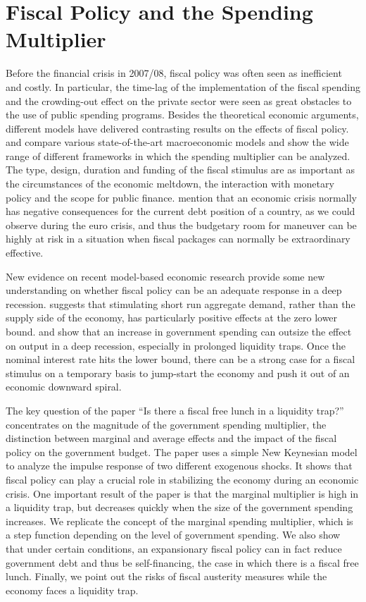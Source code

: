 \section{Fiscal Policy and the Spending Multiplier }

Before the financial crisis in 2007/08, fiscal policy was often seen as inefficient and costly. In particular, the time-lag of the implementation of the fiscal spending and the crowding-out effect on the private sector were seen as great obstacles to the use of public spending programs. Besides the theoretical economic arguments, different models have delivered contrasting results on the effects of fiscal policy. \citet{CoenenG..2010} and \citet{Afonso.2010} compare various state-of-the-art macroeconomic models and show the wide range of different frameworks in which the spending multiplier can be analyzed. The type, design, duration and funding of the fiscal stimulus are as important as the circumstances of the economic meltdown, the interaction with monetary policy and the scope for public finance. \citet{Coenen.2010} mention that an economic crisis normally has negative consequences for the current debt position of a country, as we could observe during the euro crisis, and thus the budgetary room for maneuver can be highly at risk in a situation when fiscal packages can normally be extraordinary effective.
\par
\bigskip
New evidence on recent model-based economic research provide some new understanding on whether fiscal policy can be an adequate response in a deep recession. \citet{Eggertsson.2011} suggests that stimulating short run aggregate demand, rather than the supply side of the economy, has particularly positive effects at the zero lower bound. \citet{Davig.2009} and \citet{Christiano.2011} show that an increase in government spending can outsize the effect on output in a deep recession, especially in prolonged liquidity traps. Once the nominal interest rate hits the lower bound, there can be a strong case for a fiscal stimulus on a temporary basis to jump-start the economy and push it out of an economic downward spiral.
\par
\bigskip
The key question of the paper ``Is there a fiscal free lunch in a liquidity trap?'' concentrates on the magnitude of the government spending multiplier, the distinction between marginal and average effects and the impact of the fiscal policy on the government budget.
The paper uses a simple New Keynesian model to analyze the impulse response of two different exogenous shocks. It shows that fiscal policy can play a crucial role in stabilizing the economy during an economic crisis. One important result of the paper is that the marginal multiplier is high in a liquidity trap, but decreases quickly when the size of the government spending increases. We replicate the concept of the marginal spending multiplier, which is a step function depending on the level of government spending.
We also show that under certain conditions, an expansionary fiscal policy can in fact reduce government debt and thus be self-financing, the case in which there is a fiscal free lunch. Finally, we point out the risks of fiscal austerity measures while the economy faces a liquidity trap.
